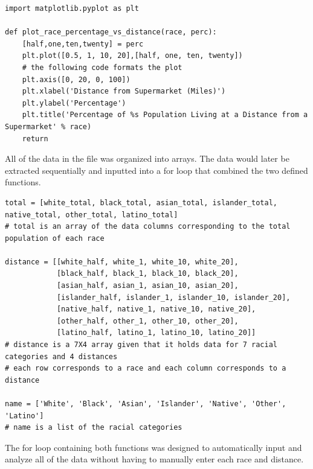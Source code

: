 \documentclass[letterpaper]{article} %
\begin{document}
\lstset{language=Python}
\begin{lstlisting}[frame=single]
import matplotlib.pyplot as plt

def plot_race_percentage_vs_distance(race, perc):
    [half,one,ten,twenty] = perc
    plt.plot([0.5, 1, 10, 20],[half, one, ten, twenty])
    # the following code formats the plot
    plt.axis([0, 20, 0, 100])
    plt.xlabel('Distance from Supermarket (Miles)')
    plt.ylabel('Percentage')
    plt.title('Percentage of %s Population Living at a Distance from a Supermarket' % race)
    return

\end{lstlisting}

All of the data in the file was organized into arrays. The data would later be extracted sequentially and inputted into a for loop that combined the two defined functions.
\vspace{0.25cm}

\lstset{language=Python}
\begin{lstlisting}[frame=single]
total = [white_total, black_total, asian_total, islander_total, native_total, other_total, latino_total]
# total is an array of the data columns corresponding to the total population of each race

distance = [[white_half, white_1, white_10, white_20],
            [black_half, black_1, black_10, black_20],
            [asian_half, asian_1, asian_10, asian_20],
            [islander_half, islander_1, islander_10, islander_20],
            [native_half, native_1, native_10, native_20],
            [other_half, other_1, other_10, other_20],
            [latino_half, latino_1, latino_10, latino_20]]
# distance is a 7X4 array given that it holds data for 7 racial categories and 4 distances
# each row corresponds to a race and each column corresponds to a distance

name = ['White', 'Black', 'Asian', 'Islander', 'Native', 'Other', 'Latino']
# name is a list of the racial categories
\end{lstlisting}

The for loop containing both functions was designed to automatically input and analyze all of the data without having to manually enter each race and distance.  
\vspace{0.25cm}
\end{document}
